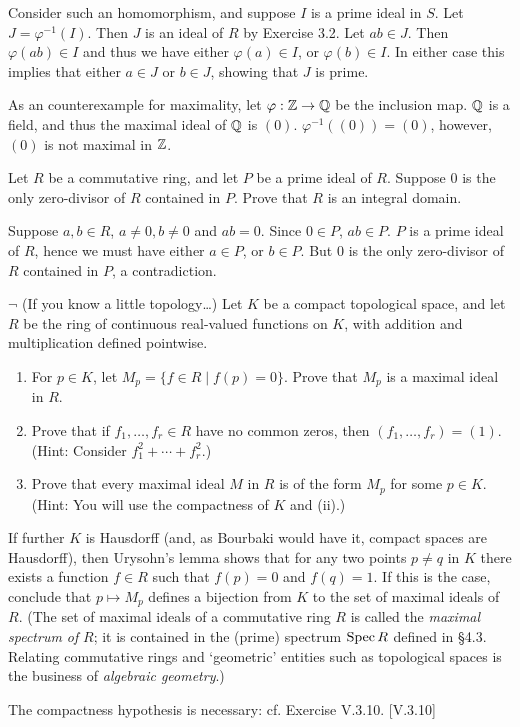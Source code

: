\begin{solution}
	Consider such an homomorphism, and suppose $I$ is a prime ideal in $S$. Let $J = \varphi^{-1}(I)$. Then $J$ is an ideal of $R$ by Exercise 3.2. Let $ab \in J$. Then $\varphi(ab) \in I$ and thus we have either $\varphi(a) \in I$, or $\varphi(b) \in I$. In either case this implies that either $a \in J$ or $b \in J$, showing that $J$ is prime.
	
	As an counterexample for maximality, let $\varphi: \mathbb{Z} \to \mathbb{Q}$ be the inclusion map. $\mathbb{Q}$ is a field, and thus the maximal ideal of $\mathbb{Q}$ is $(0)$. $\varphi^{-1}((0)) = (0)$, however, $(0)$ is not maximal in $\mathbb{Z}$.
\end{solution}

\begin{problem}
	Let $R$ be a commutative ring, and let $P$ be a prime ideal of $R$. Suppose $0$ is the only zero-divisor of $R$ contained in $P$. Prove that $R$ is an integral domain.
\end{problem}

\begin{solution}
	Suppose $a, b \in R$, $a \neq 0, b \neq 0$ and $ab = 0$. Since $0 \in P$, $ab \in P$. $P$ is a prime ideal of $R$, hence we must have either $a \in P$, or $b \in P$. But $0$ is the only zero-divisor of $R$ contained in $P$, a contradiction.
\end{solution}

\begin{problem}
	$\neg$ (If you know a little topology\dots) Let $K$ be a compact topological space, and let $R$ be the ring of continuous real-valued functions on $K$, with addition and multiplication defined pointwise.
	\begin{enumerate}[label=(\roman*)]
		\item For $p \in K$, let $M_p = \{ f \in R \mid f(p) = 0 \}$. Prove that $M_p$ is a maximal ideal in $R$.
		\item Prove that if $f_1, \dots, f_r \in R$ have no common zeros, then $(f_1, \dots, f_r) = (1)$. (Hint: Consider $f_1^2 + \cdots + f_r^2$.)
		\item Prove that every maximal ideal $M$ in $R$ is of the form $M_p$ for some $p \in K$. (Hint: You will use the compactness of $K$ and (ii).)
	\end{enumerate}
	If further $K$ is Hausdorff (and, as Bourbaki would have it, compact spaces are Hausdorff), then Urysohn's lemma shows that for any two points $p \neq q$ in $K$ there exists a function $f \in R$ such that $f(p) = 0$ and $f(q) = 1$. If this is the case, conclude that $p \mapsto M_p$ defines a bijection from $K$ to the set of maximal ideals of $R$. (The set of maximal ideals of a commutative ring $R$ is called the \emph{maximal spectrum of} $R$; it is contained in the (prime) spectrum $\operatorname{Spec} R$ defined in \S 4.3. Relating commutative rings and `geometric' entities such as topological spaces is the business of \emph{algebraic geometry}.)
	
	The compactness hypothesis is necessary: cf. Exercise V.3.10. [V.3.10]
\end{problem}

